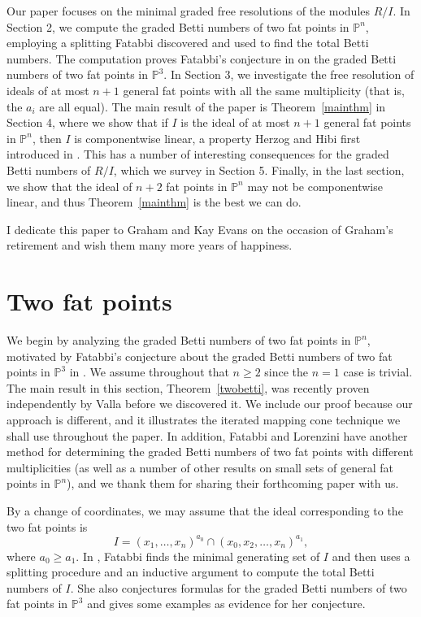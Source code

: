 \documentclass{article}
\begin{document}
Our paper focuses on the minimal graded free resolutions of the modules $R/I$. In Section 2, we compute the graded Betti numbers of two fat points in $\mathbb P^n$, employing a splitting Fatabbi discovered and used to find the total Betti numbers. The computation proves Fatabbi's conjecture in \cite{Fatabbi} on the graded Betti numbers of two fat points in $\mathbb P^3$. In Section 3, we investigate the free resolution of ideals of at most $n+1$ general fat points with all the same multiplicity (that is, the $a_i$ are all equal). The main result of the paper is Theorem~\ref{mainthm} in Section 4, where we show that if $I$ is the ideal of at most $n+1$ general fat points in $\mathbb P^n$, then $I$ is componentwise linear, a property Herzog and Hibi first introduced in \cite{HerzogHibi}. This has a number of interesting consequences for the graded Betti numbers of $R/I$, which we survey in Section 5. Finally, in the last section, we show that the ideal of $n+2$ fat points in $\mathbb P^n$ may not be componentwise linear, and thus Theorem~\ref{mainthm} is the best we can do.

I dedicate this paper to Graham and Kay Evans on the occasion of Graham's retirement and wish them many more years of happiness.

\section[2]{Two fat points}\label{s:two}

We begin by analyzing the graded Betti numbers of two fat points in $\mathbb P^n$, motivated by Fatabbi's conjecture about the graded Betti numbers of two fat points in $\mathbb P^3$ in \cite{Fatabbi}. We assume throughout that $n \ge 2$ since the $n=1$ case is trivial. The main result in this section, Theorem~\ref{twobetti}, was recently proven independently by Valla \cite{VallaTwo} before we discovered it. We include our proof because our approach is different, and it illustrates the iterated mapping cone technique we shall use throughout the paper. In addition, Fatabbi and Lorenzini have another method for determining the graded Betti numbers of two fat points with different multiplicities (as well as a number of other results on small sets of general fat points in $\mathbb P^n$), and we thank them for sharing their forthcoming paper \cite{FatabbiLorenzini} with us.

By a change of coordinates, we may assume that the ideal corresponding to the two fat points is \[ I = (x_1,\dots,x_n)^{a_0} \cap (x_0,x_2,\dots,x_n)^{a_1},\] where $a_0 \ge a_1$. In \cite{Fatabbi}, Fatabbi finds the minimal generating set of $I$ and then uses a splitting procedure and an inductive argument to compute the total Betti numbers of $I$. She also conjectures formulas for the graded Betti numbers of two fat points in $\mathbb P^3$ and gives some examples as evidence for her conjecture. 
\end{document}
